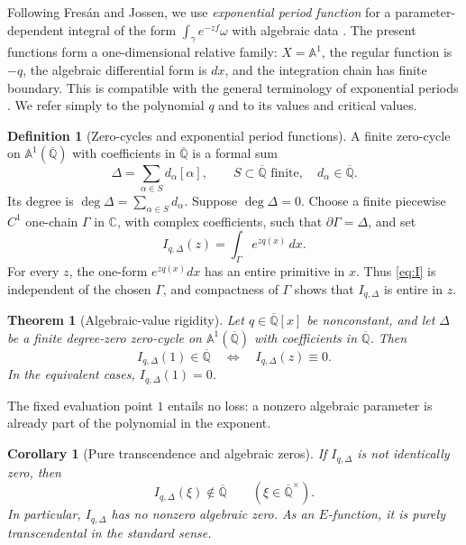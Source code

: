 \documentclass[11pt]{article}
\numberwithin{equation}{section}
\newtheorem{theorem}{Theorem}[section]
\newtheorem{corollary}[corollary]{Corollary}
\theoremstyle{definition}
\newtheorem{definition}[definition]{Definition}
\theoremstyle{remark}
\newcommand{\C}{\mathbb C}
\newcommand{\Qbar}{\overline{\mathbb Q}}
\newcommand{\Aone}{\mathbb A^1}
\begin{document}
Following Fres\'an and Jossen, we use \emph{exponential period function} for
a parameter-dependent integral of the form $\int_\gamma e^{-zf}\omega$ with
algebraic data \cite{FresanJossen}.  The present functions form a
one-dimensional relative family: $X=\Aone$, the regular function is $-q$,
the algebraic differential form is $dx$, and the integration chain has finite
boundary.  This is compatible with the general terminology of exponential
periods \cite{CommelinHabeggerHuber,FresanJossenExp}.  We refer simply to the polynomial $q$
and to its values and critical values.

\begin{definition}[Zero-cycles and exponential period functions]
A finite zero-cycle on $\Aone(\Qbar)$ with coefficients in $\Qbar$ is a
formal sum
\[
  \Delta=\sum_{\alpha\in S}d_\alpha[\alpha],
  \qquad
  S\subset\Qbar\text{ finite},\quad d_\alpha\in\Qbar.
\]
Its degree is $\deg\Delta=\sum_{\alpha\in S}d_\alpha$.  Suppose
$\deg\Delta=0$.  Choose a finite piecewise $C^1$ one-chain $\Gamma$ in
$\C$, with complex coefficients, such that $\partial\Gamma=\Delta$, and set
\begin{equation}\label{eq:I}
  I_{q,\Delta}(z)=\int_\Gamma e^{zq(x)}\,dx.
\end{equation}
For every $z$, the one-form $e^{zq(x)}dx$ has an entire primitive in $x$.
Thus \eqref{eq:I} is independent of the chosen $\Gamma$, and compactness of
$\Gamma$ shows that $I_{q,\Delta}$ is entire in $z$.
\end{definition}

\begin{theorem}[Algebraic-value rigidity]\label{thm:rigidity}
Let $q\in\Qbar[x]$ be nonconstant, and let $\Delta$ be a finite degree-zero
zero-cycle on $\Aone(\Qbar)$ with coefficients in $\Qbar$.  Then
\begin{equation}\label{eq:rigidity}
  I_{q,\Delta}(1)\in\Qbar
  \quad\Longleftrightarrow\quad
  I_{q,\Delta}(z)\equiv0.
\end{equation}
In the equivalent cases, $I_{q,\Delta}(1)=0$.
\end{theorem}

The fixed evaluation point $1$ entails no loss: a nonzero algebraic
parameter is already part of the polynomial in the exponent.

\begin{corollary}[Pure transcendence and algebraic zeros]
\label{cor:purely-transcendental}
If $I_{q,\Delta}$ is not identically zero, then
\[
  I_{q,\Delta}(\xi)\notin\Qbar
  \qquad(\xi\in\Qbar^\times).
\]
In particular, $I_{q,\Delta}$ has no nonzero algebraic zero.  As an
$E$-function, it is purely transcendental in the standard sense.
\end{corollary}
\end{document}
